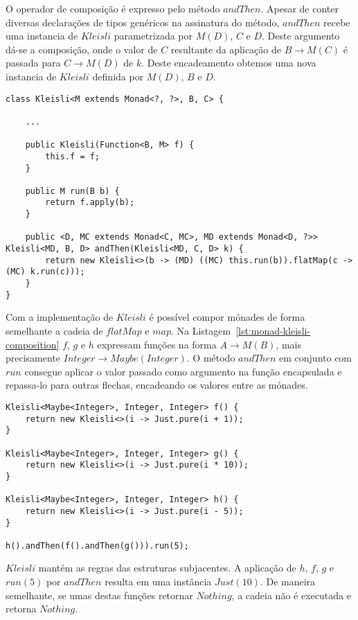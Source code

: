 \documentclass[10pt, conference]{IEEEtran}
\begin{document}
O operador de composição é expresso pelo método $andThen$. Apesar de conter diversas declarações de tipos genéricos na assinatura do método, $andThen$ recebe uma instancia de $Kleisli$ parametrizada por $M(D)$, $C$ e $D$. Deste argumento dá-se a composição, onde o valor de $C$ resultante da aplicação de $B \rightarrow M(C)$ é passada para $C \rightarrow M(D)$ de $k$. Deste encadeamento obtemos uma nova instancia de $Kleisli$ definida por $M(D)$, $B$ e $D$.

\begin{lstlisting}[float = *, caption = {Implementação de $Kleisli$}, label = {lst:java-right-kleisli-instance}]
class Kleisli<M extends Monad<?, ?>, B, C> {

	...

	public Kleisli(Function<B, M> f) {
		this.f = f;
	}

	public M run(B b) {
		return f.apply(b);
	}

	public <D, MC extends Monad<C, MC>, MD extends Monad<D, ?>> Kleisli<MD, B, D> andThen(Kleisli<MD, C, D> k) {
		return new Kleisli<>(b -> (MD) ((MC) this.run(b)).flatMap(c -> (MC) k.run(c)));
	}
}
\end{lstlisting}

Com a implementação de $Kleisli$ é possível compor mónades de forma semelhante a cadeia de $flatMap$ e $map$. Na Listagem~\ref{lst:monad-kleisli-composition} $f$, $g$ e $h$ expressam funções na forma ${A \rightarrow M(B)}$, mais precisamente ${Integer \rightarrow Maybe(Integer)}$. O método $andThen$ em conjunto com $run$ consegue aplicar o valor passado como argumento na função encapsulada e repassa-lo para outras flechas, encadeando os valores entre as mónades.

\begin{lstlisting}[caption = {Composição monádica com $andThen$}, label = {lst:monad-kleisli-composition}]
Kleisli<Maybe<Integer>, Integer, Integer> f() {
	return new Kleisli<>(i -> Just.pure(i + 1));
}

Kleisli<Maybe<Integer>, Integer, Integer> g() {
	return new Kleisli<>(i -> Just.pure(i * 10));
}

Kleisli<Maybe<Integer>, Integer, Integer> h() {
	return new Kleisli<>(i -> Just.pure(i - 5));
}

h().andThen(f().andThen(g())).run(5);

\end{lstlisting}

$Kleisli$ mantém as regras das estruturas subjacentes. A aplicação de $h$, $f$, $g$ e $run(5)$ por $andThen$ resulta em uma instância $Just(10)$. De maneira semelhante, se umas destas funções retornar  $Nothing$, a cadeia não é executada e retorna $Nothing$.
\end{document}
